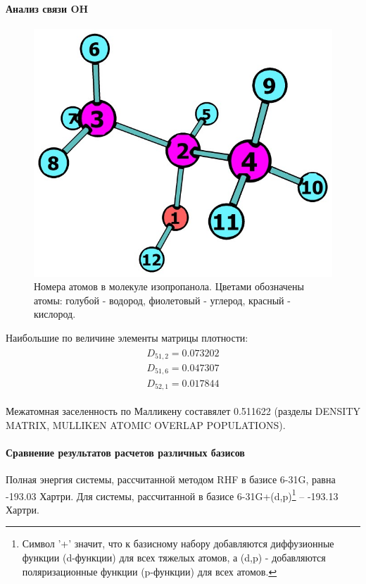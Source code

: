 \paragraph*{Анализ связи OH}
\begin{figure}[H]
\centering
\captionsetup{justification=centering}
\includegraphics[scale=0.4]{fig/1.jpg}
\caption{Номера атомов в молекуле изопропанола. Цветами обозначены атомы: голубой - водород, фиолетовый - углерод, красный - кислород.}
\end{figure}

Наибольшие по величине элементы матрицы плотности:
\begin{equation}
\begin{split}
\begin{gathered}
D_{51,2} = 0.073202 \\
D_{51,6} = 0.047307 \\
D_{52,1} = 0.017844
\end{gathered}
\end{split}
\end{equation}

Межатомная заселенность по Малликену составялет 0.511622 (разделы DENSITY MATRIX, MULLIKEN ATOMIC OVERLAP POPULATIONS).

\paragraph*{Сравнение результатов расчетов различных базисов}
Полная энергия системы, рассчитанной методом RHF в базисе 6-31G, равна -193.03 Хартри. Для системы, рассчитанной в базисе 6-31G+(d,p)\footnote{Символ '+' значит, что к базисному набору добавляются диффузионные функции (d-функции) для всех тяжелых атомов, а (d,p) - добавляются поляризационные функции (p-функции) для всех атомов.} -- -193.13 Хартри. 

